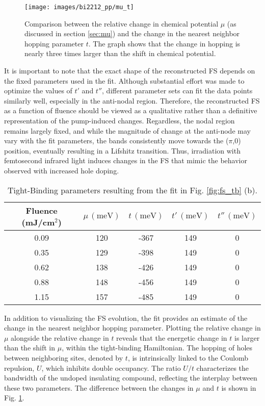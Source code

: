 \begin{figure}
	\centering
	\texttt{[image: images/bi2212\_pp/mu\_t]}
	\caption{Comparison between the relative change in chemical potential $\mu$ (as discussed in section \ref{sec:mu}) and the change in the nearest neighbor hopping parameter $t$. The graph shows that the change in hopping is nearly three times larger than the shift in chemical potential.}
	\label{fig:mu_t}
\end{figure}

It is important to note that the exact shape of the reconstructed FS depends on the fixed parameters used in the fit.
Although substantial effort was made to optimize the values of $t'$ and $t''$, different parameter sets can fit the data points similarly well, especially in the anti-nodal region.
Therefore, the reconstructed FS as a function of fluence should be viewed as a qualitative rather than a definitive representation of the pump-induced changes.
Regardless, the nodal region remains largely fixed, and while the magnitude of change at the anti-node may vary with the fit parameters, the bands consistently move towards the ($\pi$,$0$) position, eventually resulting in a Lifshitz transition.
Thus, irradiation with femtosecond infrared light induces changes in the FS that mimic the behavior observed with increased hole doping.

\begin{table}[b!]
	\centering
		\begin{tabular}{ccccc}
			\toprule[1pt]\midrule[0.3pt]
			Fluence (mJ/cm\(^2\)) & \(\mu \, (\text{meV})\) & \(t \, (\text{meV})\) & \(t' \, (\text{meV})\) & \(t'' \, (\text{meV})\) \\ 
			\midrule
			0.09 & 120 & -367 & 149 & 0 \\ 
			0.35 & 129 & -398 & 149 & 0 \\ 
			0.62 & 138 & -426 & 149 & 0 \\ 
			0.88 & 148 & -456 & 149 & 0 \\ 
			1.15 & 157 & -485 & 149 & 0 \\ 
			\midrule[0.3pt]\bottomrule[1pt]
		\end{tabular}
		\caption{Tight-Binding parameters resulting from the fit in Fig. \ref{fig:fs_tb} (b).}
		\label{tab:tb}
	\end{table}
	
In addition to visualizing the FS evolution, the fit provides an estimate of the change in the nearest neighbor hopping parameter.
Plotting the relative change in $\mu$ alongside the relative change in $t$ reveals that the energetic change in $t$ is larger than the shift in $\mu$, within the tight-binding Hamiltonian.
The hopping of holes between neighboring sites, denoted by $t$, is intrinsically linked to the Coulomb repulsion, $U$, which inhibits double occupancy.
The ratio $U/t$ characterizes the bandwidth of the undoped insulating compound, reflecting the interplay between these two parameters.
The difference between the changes in $\mu$ and $t$ is shown in Fig. \ref{fig:mu_t}.

